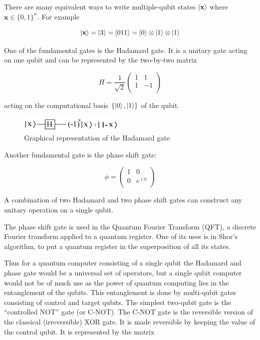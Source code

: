 There are many equivalent ways to write multiple-qubit states \( \left| \mathbf{x} \right> \) where \( \mathbf{x} \in \{0,1 \}^n \). For example

\begin{equation}
 \left| \mathbf{x} \right> = \left| 3 \right> = \left| 011 \right> = \left| 0 \right> \otimes \left| 1 \right> \otimes \left| 1 \right>
\end{equation}

One of the fundamental gates is the Hadamard gate. It is a unitary gate acting on one qubit and can be represented by the two-by-two matrix 

\begin{equation}
 H = \frac{1}{\sqrt{2}}
  \begin{pmatrix} 1 & 1 \\ 1 & -1 \\ \end{pmatrix}
\end{equation}

acting on the computational basis \(\{\left| 0 \right>,\left| 1 \right>\}\) of the qubit.

\begin{figure}[H]
	\centering
	\includegraphics[width=50mm]{./images/hadamard}
	\caption{Graphical representation of the Hadamard gate}
\end{figure}

Another fundamental gate is the phase shift gate:

\begin{equation}
 \phi = \begin{pmatrix}	1 & 0 \\  0 & e^{ \imath \phi } \\ \end{pmatrix}
\end{equation}

A combination of two Hadamard and two phase shift gates can construct any unitary operation on a single qubit.

The phase shift gate is used in the Quantum Fourier Transform (QFT), a discrete Fourier transform applied to a quantum register. One of its uses is in Shor's algorithm, to put a quantum register in the superposition of all its states.

Thus for a quantum computer consisting of a single qubit the Hadamard and phase gate would be a universal set of operators, but a single qubit computer would not be of much use as the power of quantum computing lies in the entanglement of the qubits. This entanglement is done by multi-qubit gates consisting of control and target qubits. The simplest two-qubit gate is the “controlled NOT” gate (or C-NOT). The C-NOT gate is the reversible version of the classical (irreversible) XOR gate. It is made reversible by keeping the value of the control qubit. It is represented by the matrix

